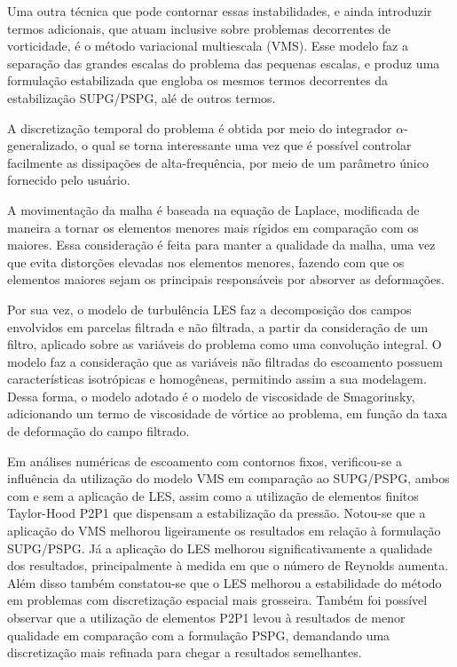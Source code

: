 Uma outra técnica que pode contornar essas instabilidades, e ainda introduzir termos adicionais, que atuam inclusive sobre problemas decorrentes de vorticidade, é o método variacional multiescala (VMS). Esse modelo faz a separação das grandes escalas do problema das pequenas escalas, e produz uma formulação estabilizada que engloba os mesmos termos decorrentes da estabilização SUPG/PSPG, alé de outros termos.

A discretização temporal do problema é obtida por meio do integrador $\alpha$-generalizado, o qual se torna interessante uma vez que é possível controlar facilmente as dissipações de alta-frequência, por meio de um parâmetro único fornecido pelo usuário.

A movimentação da malha é baseada na equação de Laplace, modificada de maneira a tornar os elementos menores mais rígidos em comparação com os maiores. Essa consideração é feita para manter a qualidade da malha, uma vez que evita distorções elevadas nos elementos menores, fazendo com que os elementos maiores sejam os principais responsáveis por absorver as deformações.

Por sua vez, o modelo de turbulência LES faz a decomposição dos campos envolvidos em parcelas filtrada e não filtrada, a partir da consideração de um filtro, aplicado sobre as variáveis do problema como uma convolução integral. O modelo faz a consideração que as variáveis não filtradas do escoamento possuem características isotrópicas e homogêneas, permitindo assim a sua modelagem. Dessa forma, o modelo adotado é o modelo de viscosidade de Smagorinsky, adicionando um termo de viscosidade de vórtice ao problema, em função da taxa de deformação do campo filtrado.

Em análises numéricas de escoamento com contornos fixos, verificou-se a influência da utilização do modelo VMS em comparação ao SUPG/PSPG, ambos com e sem a aplicação de LES, assim como a utilização de elementos finitos Taylor-Hood P2P1 que dispensam a estabilização da pressão. Notou-se que a aplicação do VMS melhorou ligeiramente os resultados em relação à formulação SUPG/PSPG. Já a aplicação do LES melhorou significativamente a qualidade dos resultados, principalmente à medida em que o número de Reynolds aumenta. Além disso também constatou-se que o LES melhorou a estabilidade do método em problemas com discretização espacial mais grosseira. Também foi possível observar que a utilização de elementos P2P1 levou à resultados de menor qualidade em comparação com a formulação PSPG, demandando uma discretização mais refinada para chegar a resultados semelhantes. 

